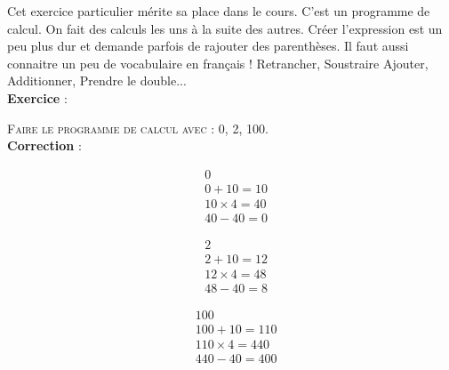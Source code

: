 \documentclass[11pt]{article}
\begin{document}
Cet exercice particulier mérite sa place dans le cours. C'est un programme de calcul. On fait des calculs les uns à la suite des autres. Créer l'expression est un peu plus dur et demande parfois de rajouter des parenthèses. Il faut aussi connaitre un peu de vocabulaire en français ! Retrancher, Soustraire Ajouter, Additionner, Prendre le double... \\

\textbf{Exercice} : 

\begin{center}\end{center}

\textsc{Faire le programme de calcul avec : 0, 2, 100.} \\

\textbf{Correction} :

\begin{minipage}{0.3\textwidth}

\begin{align*}
& 0 \\
& 0 + 10 = 10 \\
& 10 \times 4 = 40\\
& 40 - 40 = 0
\end{align*}

\end{minipage}\begin{minipage}{0.3\textwidth}

\begin{align*}
& 2 \\
& 2 + 10 = 12 \\
& 12 \times 4 = 48\\
& 48 - 40 = 8
\end{align*}

\end{minipage}\begin{minipage}{0.3\textwidth}

\begin{align*}
& 100 \\
& 100 + 10 = 110 \\
& 110 \times 4 = 440\\
& 440 - 40 = 400
\end{align*}

\end{minipage}
\end{document}
